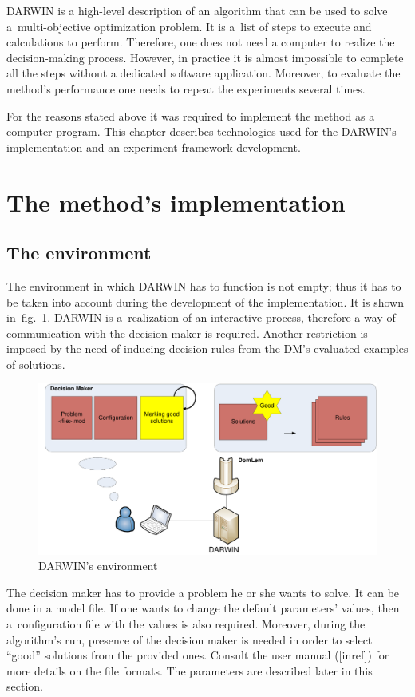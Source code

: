 DARWIN is a high-level description of an algorithm that can be used to solve
a~multi-objective optimization problem. It is a~list of steps to execute and
calculations to perform. Therefore, one does not need a computer to realize
the decision-making process. However, in practice it is almost impossible to
complete all the steps without a dedicated software application. Moreover, to
evaluate the method's performance one needs to repeat the experiments several
times.

For the reasons stated above it was required to implement the method as a
computer program. This chapter describes technologies used for the DARWIN's
implementation and an experiment framework development.

\section{The method's implementation}

\subsection{The environment}

The environment in which DARWIN has to function is not empty; thus it has to
be taken into account during the development of the implementation. It is
shown in~fig.~\ref{environ}. DARWIN is a~realization of an interactive
process, therefore a way of communication with the decision maker is
required. Another restriction is imposed by the need of inducing decision
rules from the DM's evaluated examples of solutions.

\begin{figure}
  \centering \includegraphics[scale=0.5]{img/environ}
  \caption{DARWIN's environment}
  \label{environ}
\end{figure}

The decision maker has to provide a problem he or she wants to solve. It can
be done in a model file. If one wants to change the default parameters'
values, then a~configuration file with the values is also required. Moreover,
during the algorithm's run, presence of the decision maker is needed in order
to select ``good'' solutions from the provided ones. Consult the user manual
([inref]) for more details on the file formats. The parameters are described
later in this section.

